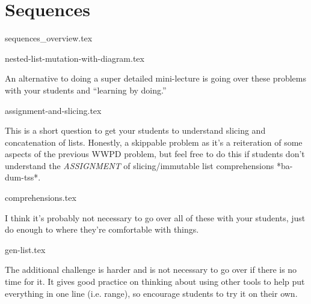 \documentclass{exam}
\begin{document}
\section{Sequences}
{sequences_overview.tex}
\begin{questions}
    {nested-list-mutation-with-diagram.tex}
    \begin{questionmeta}
        An alternative to doing a super detailed mini-lecture is going over these problems with your students and ``learning by doing.'' 
    \end{questionmeta}
    {assignment-and-slicing.tex}
    \begin{questionmeta}
        This is a short question to get your students to understand slicing and concatenation of lists. Honestly, a skippable problem as it's a reiteration of some aspects of the previous WWPD problem, but feel free to do this if students don't understand the \textit{ASSIGNMENT} of slicing/immutable list comprehensions *ba-dum-tss*.
    \end{questionmeta}
    {comprehensions.tex}
    \begin{questionmeta}
        I think it's probably not necessary to go over all of these with your students, just do enough to where they're comfortable with things. 
    \end{questionmeta}
    {gen-list.tex}
    \begin{questionmeta}
        The additional challenge is harder and is not necessary to go over if there is no time for it. It gives good practice on thinking about using other tools to help put everything in one line (i.e. range), so encourage students to try it on their own.
    \end{questionmeta}
\end{questions}
\end{document}
